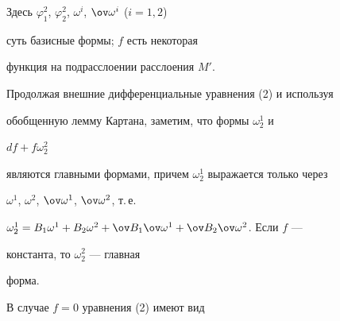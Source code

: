 Здесь $\varphi^2_1$, $\varphi^2_2$, $\omega^i$, $\ov\omega^i$ ($i=1,2$) 


суть базисные формы; $f$ есть некоторая 


функция на подрасслоении расслоения $M'$. 


 


Продолжая внешние дифференциальные уравнения (2) и используя 


обобщенную лемму Картана, заметим, что формы $\omega^1_2$ и 


$df+f\omega^2_2$ 


являются главными формами, причем $\omega^1_2$ выражается только через 


$\omega^1$, $\omega^2$, $\ov\omega^1$, $\ov\omega^2$, т.\,е. 


$\omega^1_2=B_1\omega^1+B_2\omega^2+\ov B_1\ov\omega^1+ 


\ov B_2\ov\omega^2$. Если $f$ --- 


константа, то $\omega^2_2$ --- главная 


форма. 


 


В случае $f=0$ уравнения (2) имеют вид 


